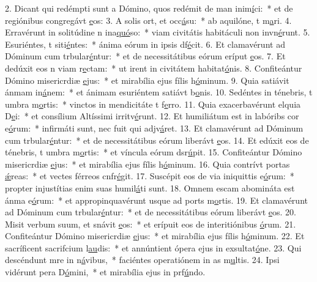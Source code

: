 2. Dicant qui redémpti sunt a Dómino, quos redémit de man inim\uline{í}ci:~* et de regiónibus congregávt \uline{e}os:
3. A solis ort, et occ\uline{á}su:~* ab aquilóne, t m\uline{a}ri.
4. Erravérunt in solitúdine n ina\uline{quó}so:~* viam civitátis habitáculi non invn\uline{é}runt.
5. Esuriéntes, t siti\uline{é}ntes:~* ánima eórum in ipsis df\uline{é}cit.
6. Et clamavérunt ad Dóminum cum trbular\uline{é}ntur:~* et de necessitátibus eórum eríput \uline{e}os.
7. Et dedúxit eos n viam r\uline{e}ctam:~* ut irent in civitátem habitat\uline{ó}nis.
8. Confiteántur Dómino misericrdiæ \uline{e}jus:~* et mirabília ejus fílis h\uline{ó}minum.
9. Quia satiávit ánmam in\uline{á}nem:~* et ánimam esuriéntem satiávt b\uline{o}nis.
10. Sedéntes in ténebris, t umbra m\uline{o}rtis:~* vinctos in mendicitáte t f\uline{e}rro.
11. Quia exacerbavérunt elquia D\uline{e}i:~* et consílium Altíssimi irritv\uline{é}runt.
12. Et humiliátum est in labóribs cor e\uline{ó}rum:~* infirmáti sunt, nec fuit qui adjv\uline{á}ret.
13. Et clamavérunt ad Dóminum cum trbular\uline{é}ntur:~* et de necessitátibus eórum liberávt \uline{e}os.
14. Et edúxit eos de ténebris, t umbra m\uline{o}rtis:~* et víncula eórum dsr\uline{ú}pit.
15. Confiteántur Dómino misericrdiæ \uline{e}jus:~* et mirabília ejus fílis h\uline{ó}minum.
16. Quia contrívt portas \uline{ǽ}reas:~* et vectes férreos cnfr\uline{é}git.
17. Suscépit eos de via iniquittis e\uline{ó}rum:~* propter injustítias enim suas humil\uline{á}ti sunt.
18. Omnem escam abomináta est ánma e\uline{ó}rum:~* et appropinquavérunt usque ad ports m\uline{o}rtis.
19. Et clamavérunt ad Dóminum cum trbular\uline{é}ntur:~* et de necessitátibus eórum liberávt \uline{e}os.
20. Misit verbum suum, et snávit \uline{e}os:~* et erípuit eos de interitiónibus \uline{ó}rum.
21. Confiteántur Dómino misericrdiæ \uline{e}jus:~* et mirabília ejus fílis h\uline{ó}minum.
22. Et sacríficent sacrifcium l\uline{au}dis:~* et annúntient ópera ejus in exsultat\uline{ó}ne.
23. Qui descéndunt mre in n\uline{á}vibus,~* faciéntes operatiónem in as m\uline{u}ltis.
24. Ipsi vidérunt pera D\uline{ó}mini,~* et mirabília ejus in prf\uline{ú}ndo.
